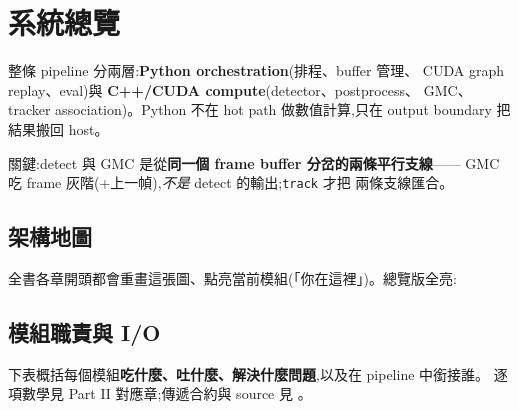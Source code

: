 \chapter{系統總覽}\label{ch:overview}

整條 pipeline 分兩層:\textbf{Python orchestration}(排程、buffer 管理、
CUDA graph replay、eval)與 \textbf{C++/CUDA compute}(detector、postprocess、
GMC、tracker association)。Python 不在 hot path 做數值計算,只在 output
boundary 把結果搬回 host。

關鍵:detect 與 GMC 是從\textbf{同一個 frame buffer 分岔的兩條平行支線}——
GMC 吃 frame 灰階(+上一幀),\emph{不是} detect 的輸出;\texttt{track} 才把
兩條支線匯合。

\section{架構地圖}\label{sec:archmap}
全書各章開頭都會重畫這張圖、點亮當前模組(「你在這裡」)。總覽版全亮:

\begin{center}
\end{center}

\section{模組職責與 I/O}\label{sec:modules}
下表概括每個模組\textbf{吃什麼、吐什麼、解決什麼問題},以及在 pipeline 中銜接誰。
逐項數學見 Part II 對應章;傳遞合約與 source 見 。

